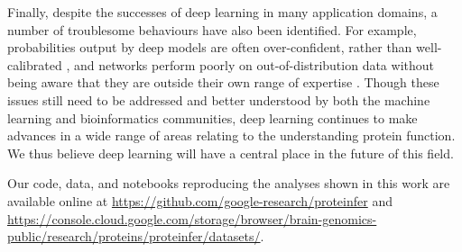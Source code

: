 Finally, despite the successes of deep learning in many application domains, a number of troublesome behaviours have also been identified. For example, probabilities output by deep models are often over-confident, rather than well-calibrated \citep{guo}, and networks perform poorly on out-of-distribution data without being aware that they are outside their own range of expertise \citep{amoidei}. Though these issues still need to be addressed and better understood by both the machine learning and bioinformatics communities, deep learning continues to make advances in a wide range of areas relating to the understanding protein function. We thus believe deep learning will have a central place in the future of this field.



Our code, data, and notebooks reproducing the analyses shown in this work are available online at \url{https://github.com/google-research/proteinfer} and \url{https://console.cloud.google.com/storage/browser/brain-genomics-public/research/proteins/proteinfer/datasets/}.



